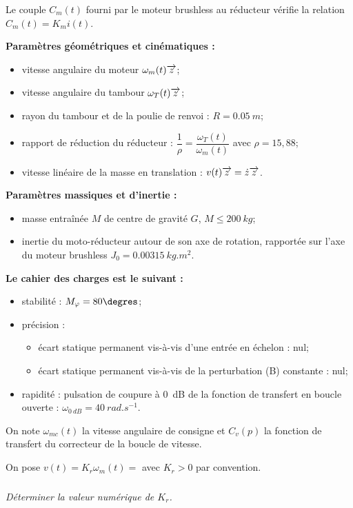 \documentclass[10pt,fleqn]{article} %
\begin{document}
\begin{multicols}{2}
Le couple $C_m(t)$ fourni par le moteur brushless au réducteur vérifie la relation $C_m(t)=K_mi(t)$.

\textbf{Paramètres géométriques et cinématiques :}
\begin{itemize}
\item vitesse angulaire du moteur $\omega_m(t)\overrightarrow{z}$;
\item vitesse angulaire du tambour $\omega_T(t)\overrightarrow{z}$;
\item rayon du tambour et de la poulie de renvoi : $R=\SI{0,05}{m}$;
\item rapport de réduction du réducteur : $\dfrac{1}{\rho}=\dfrac{\omega_T(t)}{\omega_m(t)}$ avec $\rho=15,88$;
\item vitesse linéaire de la masse en translation : $v(t)\overrightarrow{z}=\dot{z}\overrightarrow{z}$.
\end{itemize}

\textbf{Paramètres massiques et d'inertie :}
\begin{itemize}
\item masse entraînée $M$ de centre de gravité $G$, $M\leq \SI{200}{kg}$;
\item inertie du moto-réducteur autour de son axe de rotation, rapportée sur l’axe du moteur brushless $J_0=\SI{0,00315}{kg.m^2}$.
\end{itemize}

\textbf{Le cahier des charges est le suivant : }
\begin{itemize}
\item stabilité : $M_{\varphi}=80\degres$;
\item précision : 
\begin{itemize}
\item écart statique permanent vis-à-vis d'une entrée en échelon : nul;
\item écart statique permanent vis-à-vis de la perturbation (B) constante : nul;
\end{itemize}
\item rapidité : pulsation de coupure à \SI{0}{dB} de la fonction de transfert en boucle ouverte : $\omega_{\SI{0}{dB}}=\SI{40}{rad.s^{-1}}$.
\end{itemize}
On note $\omega_{mc}(t)$ la vitesse angulaire de consigne et $C_v(p)$ la fonction de transfert du correcteur de la boucle de vitesse.

On pose $v(t)=K_r \omega_m(t)=$ avec $K_r>0$ par convention.
\subparagraph{}
\textit{Déterminer la valeur numérique de $K_r$.}%


\end{multicols}
\end{document}
